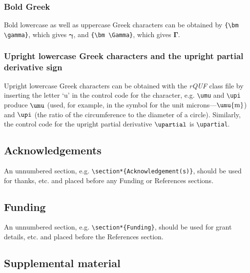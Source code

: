 \documentclass{rQUF2e}
\theoremstyle{plain}
\theoremstyle{definition}
\theoremstyle{remark}
\begin{document}
\subsubsection{Bold Greek}\label{boldgreek}

Bold lowercase as well as uppercase Greek characters can be
obtained by \verb"{\bm \gamma}", which gives ${\bm \gamma}$, and
\verb"{\bm \Gamma}", which gives ${\bm \Gamma}$.

\subsubsection{Upright lowercase Greek characters and the upright partial derivative sign}\label{upgreek}

Upright lowercase Greek characters can be obtained with the \textit{rQUF} class
file by inserting the letter `u' in the control code for the character,
e.g. \verb"\umu" and \verb"\upi" produce $\umu$ (used, for example, in the
symbol for the unit microns---$\umu{\rm m}$) and $\upi$ (the ratio of the
circumference to the diameter of a circle). Similarly, the control
code for the upright partial derivative $\upartial$ is \verb"\upartial".


\subsection{Acknowledgements}

An unnumbered section, e.g. \verb"\section*{Acknowledgement(s)}", should be used for thanks, etc.
and placed before any Funding or References sections.


\subsection{Funding}

An unnumbered section, e.g. \verb"\section*{Funding}", should be used for grant details, etc.
and placed before the References section.


\subsection{Supplemental material}
\end{document}
